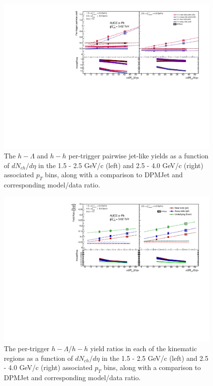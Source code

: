 \documentclass[ALICE,manyauthors]{ALICE_analysis_notes}
\begin{document}
\begin{figure}[ht]
\centering
\includegraphics[width=6in]{figures/final_pairwise_plot_new_x_axis_model_ratio.pdf}
\caption{The $h-\Lambda$ and $h-h$ per-trigger pairwise jet-like yields as a function of $dN_{ch}/d\eta$ in the 1.5 - 2.5 GeV/c (left) and 2.5 - 4.0 GeV/c (right) associated $p_{T}$ bins, along with a comparison to DPMJet and corresponding model/data ratio.}
\label{pairwise_final_figure}
\end{figure}

\begin{figure}[ht]
\centering
\includegraphics[width=6in]{figures/final_lambda_hadron_ratio_plot_new_x_axis_model_ratio.pdf}
\caption{The per-trigger $h-\Lambda$/$h-h$ yield ratios in each of the kinematic regions as a function of $dN_{ch}/d\eta$ in the 1.5 - 2.5 GeV/c (left) and 2.5 - 4.0 GeV/c (right) associated $p_{T}$ bins, along with a comparison to DPMJet and corresponding model/data ratio.}
\label{ratio_final_figure}
\end{figure}
\end{document}
